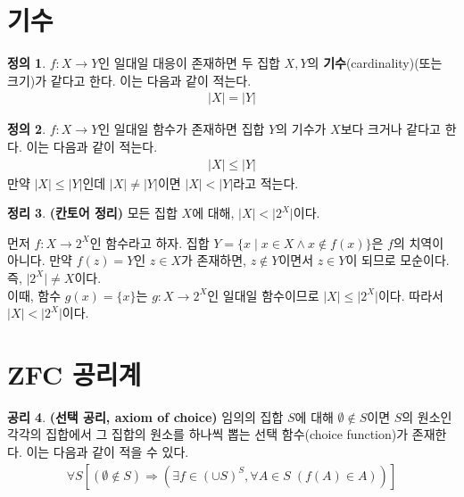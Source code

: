 \documentclass[b5paper, 10pt]{book}
\theoremstyle{definition}
\newtheorem{defn}{정의}[chapter]
\newtheorem{thm}[defn]{정리}
\newtheorem{axm}[defn]{공리}
\newenvironment{pf*}{\pushQED{\qed}\pf}{\popQED\endpf}
\begin{document}
\section{기수}
\begin{defn}
    $f: X \rightarrow Y$인 일대일 대응이 존재하면
    두 집합 $X, Y$의 \textbf{기수}(cardinality)(또는 크기)가 같다고 한다.
     이는 다음과 같이 적는다.
    \begin{align*}
        \vert X \vert = \vert Y \vert
    \end{align*}
\end{defn}
\begin{defn}
    $f: X \rightarrow Y$인 일대일 함수가
    존재하면 집합 $Y$의 기수가 $X$보다 크거나 같다고 한다. 이는 다음과 같이 적는다.
    \begin{align*}
        \vert X \vert \le \vert Y \vert
    \end{align*} 
    만약 $\vert X \vert \le \vert Y \vert$인데 $\vert X \vert \neq \vert Y \vert$이면
    $\vert X \vert < \vert Y \vert$라고 적는다.
\end{defn}
\begin{thm}
    \textbf{(칸토어 정리)} 모든 집합 $X$에 대해, $\vert X \vert < \vert 2^X \vert$이다.
\end{thm}
\begin{pf*}
    먼저 $f: X \rightarrow 2^X$인 함수라고 하자. 집합 $Y = \{x \;\vert\; x \in X \wedge
    x \notin f(x)\}$은 $f$의 치역이 아니다. 만약 $f(z) = Y$인 $z \in X$가 존재하면,
    $z \notin Y$이면서 $z \in Y$이 되므로 모순이다. 즉, $\vert 2^X \vert
    \neq X$이다. \\ 
    이때, 함수 $g(x) = \{x\}$는 $g: X \rightarrow 2^X$인 일대일 함수이므로
    $\vert X \vert \le \vert 2^X \vert$이다. 따라서 $\vert X \vert < \vert 2^X \vert$이다.
\end{pf*}
\section{ZFC 공리계}
\begin{axm}
    \label{axiom of choice}
    \textbf{(선택 공리, axiom of choice)} 임의의 집합 $S$에 대해 $\emptyset \notin S$이면
    $S$의 원소인 각각의 집합에서 그 집합의 원소를 하나씩 뽑는 선택 함수(choice function)가
    존재한다. 이는 다음과 같이 적을 수 있다.
    \begin{align*}
        \forall S [(\emptyset \notin S) \Rightarrow (\exists f 
        \in (\cup S)^S, \forall A \in S  \; (f (A) \in A))]
    \end{align*} 
\end{axm}
\end{document}
